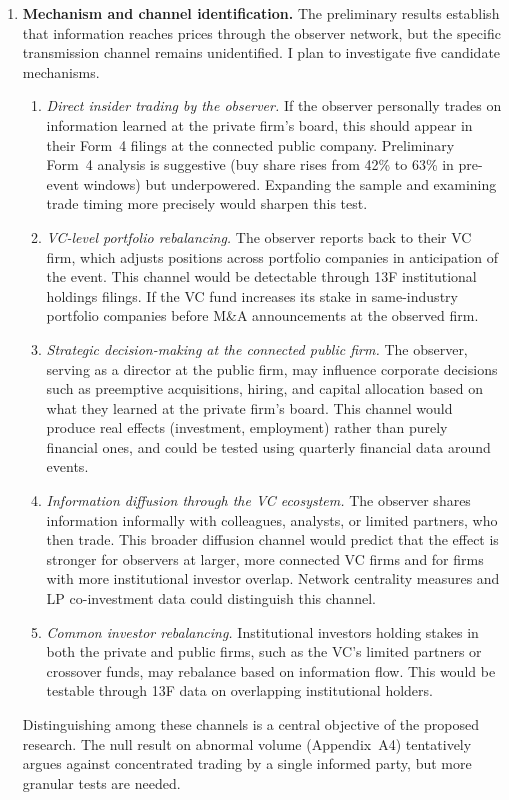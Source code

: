 \begin{enumerate}
\item \textbf{Mechanism and channel identification.} The preliminary results establish that information reaches prices through the observer network, but the specific transmission channel remains unidentified. I plan to investigate five candidate mechanisms.
\begin{enumerate}[label=(\alph*)]
\item \textit{Direct insider trading by the observer.} If the observer personally trades on information learned at the private firm's board, this should appear in their Form~4 filings at the connected public company. Preliminary Form~4 analysis is suggestive (buy share rises from 42\% to 63\% in pre-event windows) but underpowered. Expanding the sample and examining trade timing more precisely would sharpen this test.
\item \textit{VC-level portfolio rebalancing.} The observer reports back to their VC firm, which adjusts positions across portfolio companies in anticipation of the event. This channel would be detectable through 13F institutional holdings filings. If the VC fund increases its stake in same-industry portfolio companies before M\&A announcements at the observed firm.
\item \textit{Strategic decision-making at the connected public firm.} The observer, serving as a director at the public firm, may influence corporate decisions such as preemptive acquisitions, hiring, and capital allocation based on what they learned at the private firm's board. This channel would produce real effects (investment, employment) rather than purely financial ones, and could be tested using quarterly financial data around events.
\item \textit{Information diffusion through the VC ecosystem.} The observer shares information informally with colleagues, analysts, or limited partners, who then trade. This broader diffusion channel would predict that the effect is stronger for observers at larger, more connected VC firms and for firms with more institutional investor overlap. Network centrality measures and LP co-investment data could distinguish this channel.
\item \textit{Common investor rebalancing.} Institutional investors holding stakes in both the private and public firms, such as the VC's limited partners or crossover funds, may rebalance based on information flow. This would be testable through 13F data on overlapping institutional holders.
\end{enumerate}
Distinguishing among these channels is a central objective of the proposed research. The null result on abnormal volume (Appendix~A4) tentatively argues against concentrated trading by a single informed party, but more granular tests are needed.


\end{enumerate}
